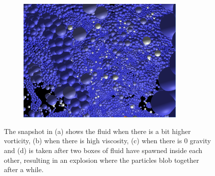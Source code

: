\begin{figure}[H]
\begin{subfigure}{.5\textwidth}
  \caption{}
\end{subfigure}%
\begin{subfigure}{.5\textwidth}
  \centering
  \includegraphics[width=0.9\textwidth]{img/closeupAfterExplosion.png}
  \caption{}
\end{subfigure}%

\caption{The snapshot in (a) shows the fluid when there is a bit higher vorticity, (b) when there is high viscosity, (c) when there is 0 gravity and (d) is taken after two boxes of fluid have spawned inside each other, resulting in an explosion where the particles blob together after a while.}
\label{fig:result0}
\end{figure}

